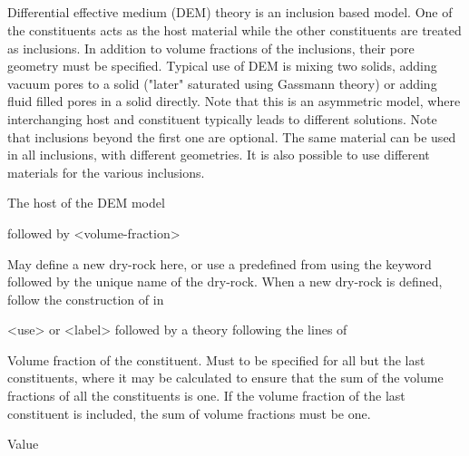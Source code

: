 {\subparagraph{}
 \slist
   \item \Description Differential effective medium (DEM) theory is an inclusion based model. One of the constituents acts as the host material while the other constituents are treated as inclusions. In addition to volume fractions of the inclusions, their pore geometry must be specified. Typical use of DEM is mixing two solids, adding vacuum pores to a solid ("later" saturated using Gassmann theory) or adding fluid filled pores in a solid directly. Note that this is an asymmetric model, where interchanging host and constituent typically leads to different solutions. Note that inclusions beyond the first one are optional. The same material can be used in all inclusions, with different geometries. It is also possible to use different materials for the various inclusions.
   \item \Argument
   \item \Default 
 \elist

 \slist
   \item \Description The host of the DEM model
   \item {} followed by <volume-fraction>
   \item \Default
 \elist

 \slist
   \item \Description  May define a new dry-rock here, or use a predefined  from  using the keyword  followed by the unique name of the dry-rock. When a new dry-rock is defined, follow the construction of  in 
   \item \Argument <use> or <label> followed by a theory following the lines of 
   \item \Default
 \elist

 \slist
   \item \Description Volume fraction of the constituent. Must to be specified for all but the last constituents, where it may be calculated to ensure that the sum of the volume fractions of all the constituents is one. If the volume fraction of the last constituent is included, the sum of volume fractions must be one. 
   \item \Argument Value
   \item \Default
 \elist

}
